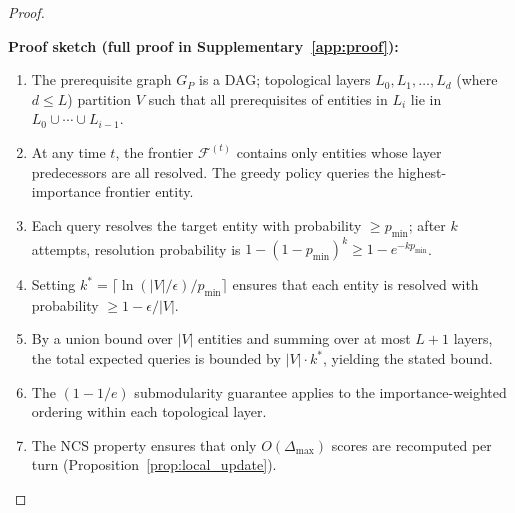 \documentclass[11pt,a4paper]{article}
\newcommand{\placeholder}[1]{%
  \begin{tcolorbox}[colback=yellow!10,colframe=orange!60!black,
    fonttitle=\bfseries,title=Placeholder]
    #1
  \end{tcolorbox}%
}
\begin{document}
\begin{proof}
\placeholder{%
  \textbf{Proof sketch (full proof in Supplementary~\ref{app:proof}):}
  \begin{enumerate}[noitemsep]
    \item The prerequisite graph $G_P$ is a DAG; topological layers
          $L_0, L_1, \ldots, L_d$ (where $d \leq L$) partition $V$ such
          that all prerequisites of entities in $L_i$ lie in $L_0 \cup
          \cdots \cup L_{i-1}$.
    \item At any time $t$, the frontier $\mathcal{F}^{(t)}$ contains only
          entities whose layer predecessors are all resolved. The greedy
          policy queries the highest-importance frontier entity.
    \item Each query resolves the target entity with probability
          $\geq p_{\min}$; after $k$ attempts, resolution probability is
          $1 - (1 - p_{\min})^k \geq 1 - e^{-k p_{\min}}$.
    \item Setting $k^* = \lceil \ln(|V|/\epsilon) / p_{\min} \rceil$ ensures
          that each entity is resolved with probability $\geq 1 - \epsilon / |V|$.
    \item By a union bound over $|V|$ entities and summing over at most
          $L + 1$ layers, the total expected queries is bounded by
          $|V| \cdot k^*$, yielding the stated bound.
    \item The $(1 - 1/e)$ submodularity guarantee applies to the
          importance-weighted ordering within each topological layer.
    \item The NCS property ensures that only $O(\Delta_{\max})$ scores are
          recomputed per turn (Proposition~\ref{prop:local_update}).
  \end{enumerate}
}
\end{proof}
\end{document}
